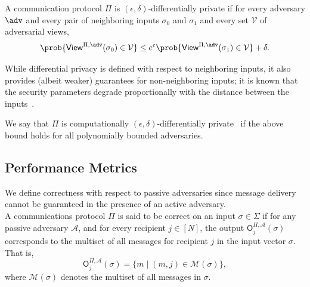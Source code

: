 \begin{definition}  \label{def:dp}
    A communication protocol $\Pi$ is $(\epsilon, \delta)$-differentially private if for every adversary $\adv$ and every pair of neighboring inputs $\sigma_0$ and $\sigma_1$ and every set $\mathcal{V}$ of adversarial views, 
    $$
    \prob{\mathsf{View}^{\Pi, \adv}(\sigma_0) \in \mathcal{V}} \le e^\epsilon \prob{\mathsf{View}^{\Pi, \adv}(\sigma_1) \in \mathcal{V}} + \delta .
    $$
    
    While differential privacy is defined with respect to neighboring inputs, it also provides (albeit weaker) guarantees for non-neighboring inputs; it is known that the security parameters degrade proportionally with the distance between the inputs~\cite{TCC:DMNS06}.

    We say that $\Pi$ is computationally $(\epsilon,\delta)$-differentially private~\cite{C:MPRV09} if the above bound holds for all polynomially bounded adversaries.\\
\end{definition} 

\subsection{Performance Metrics}

\begin{definition} [Correctness] \label{def:correctness}
    We define correctness with respect to passive adversaries since message delivery cannot be guaranteed in the presence of an active adversary.
    \\
    
    A communications protocol $\Pi$ is said to be correct on an input $\sigma \in \Sigma$ if for any passive adversary $\mathcal{A}$, and for every recipient $j \in [N]$, the output $\mathsf{O}^{\Pi, \mathcal{A}}_j(\sigma)$ corresponds to the multiset of all messages for recipient $j$ in the input vector $\sigma$. That is,
    $$
    \mathsf{O}^{\Pi, \mathcal{A}}_j(\sigma) = \{m \mid (m, j) \in \mathcal{M}(\sigma)\},
    $$
    where $\mathcal{M}(\sigma)$ denotes the multiset of all messages in $\sigma$. \\
\end{definition}

